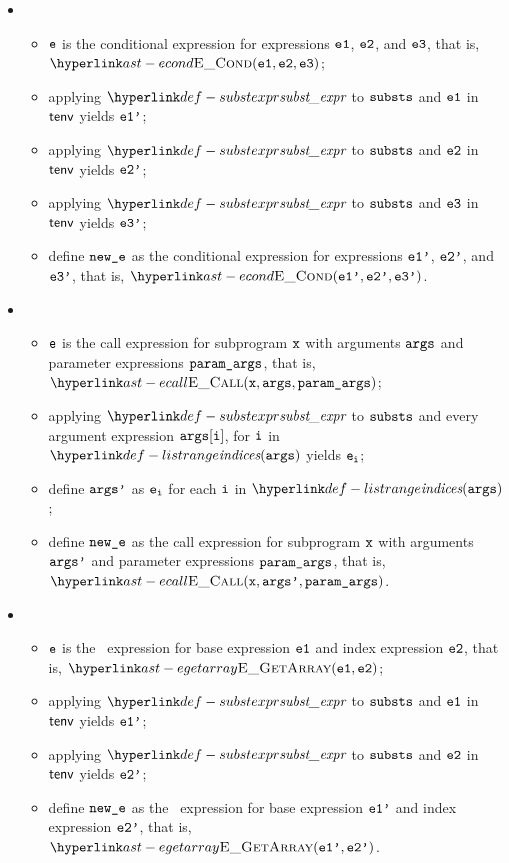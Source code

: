 \begin{itemize}
  \item {}
  \begin{itemize}
    \item $\texttt{e}$ is the conditional expression for expressions $\texttt{e1}$, $\texttt{e2}$, and $\texttt{e3}$, that is, \\
          $\ECond(\veone, \vetwo, \vethree)$;
    \item applying $\substexpr$ to $\texttt{substs}$ and $\texttt{e1}$ in $\textsf{tenv}$ yields $\texttt{e1'}$;
    \item applying $\substexpr$ to $\texttt{substs}$ and $\texttt{e2}$ in $\textsf{tenv}$ yields $\texttt{e2'}$;
    \item applying $\substexpr$ to $\texttt{substs}$ and $\texttt{e3}$ in $\textsf{tenv}$ yields $\texttt{e3'}$;
    \item define $\texttt{new\_e}$ as the conditional expression for expressions $\texttt{e1'}$, $\texttt{e2'}$, and $\texttt{e3'}$, that is, $\ECond(\veonep, \vetwop, \vethreep)$.
  \end{itemize}

  \item {}
  \begin{itemize}
    \item $\texttt{e}$ is the call expression for subprogram $\texttt{x}$ with arguments $\texttt{args}$ and parameter expressions $\texttt{param\_args}$,
          that is, $\ECall(\vx, \vargs, \paramargs)$;
    \item applying $\substexpr$ to $\texttt{substs}$ and every argument expression $\texttt{args}[\texttt{i}]$, for $\texttt{i}$ in
          $\listrange(\vargs)$ yields $\texttt{e}_{\texttt{i}}$;
    \item define $\texttt{args'}$ as $\texttt{e}_{\texttt{i}}$ for each $\texttt{i}$ in $\listrange(\vargs)$;
    \item define $\texttt{new\_e}$ as the call expression for subprogram $\texttt{x}$ with arguments $\texttt{args'}$ and parameter expressions $\texttt{param\_args}$,
    that is, $\ECall(\vx, \vargsp, \paramargs)$.
  \end{itemize}

  \item {}
  \begin{itemize}
    \item $\texttt{e}$ is the \arrayaccess\ expression for base expression $\texttt{e1}$ and index expression $\texttt{e2}$,
          that is, $\EGetArray(\veone, \vetwo)$;
    \item applying $\substexpr$ to $\texttt{substs}$ and $\texttt{e1}$ in $\textsf{tenv}$ yields $\texttt{e1'}$;
    \item applying $\substexpr$ to $\texttt{substs}$ and $\texttt{e2}$ in $\textsf{tenv}$ yields $\texttt{e2'}$;
    \item define $\texttt{new\_e}$ as the \arrayaccess\ expression for base expression $\texttt{e1'}$ and index expression $\texttt{e2'}$,
    that is, $\EGetArray(\veonep, \vetwop)$.
  \end{itemize}


\end{itemize}

